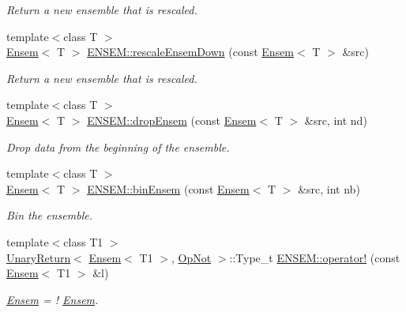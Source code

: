 \begin{DoxyCompactItemize}
\begin{DoxyCompactList}\small\item\em Return a new ensemble that is rescaled. \end{DoxyCompactList}\item 
{\footnotesize template$<$class T $>$ }\\\mbox{\hyperlink{classENSEM_1_1Ensem}{Ensem}}$<$ T $>$ \mbox{\hyperlink{group__eensem_gae1ec6cc73aa72bf1f07360fa333487fe}{E\+N\+S\+E\+M\+::rescale\+Ensem\+Down}} (const \mbox{\hyperlink{classENSEM_1_1Ensem}{Ensem}}$<$ T $>$ \&src)
\begin{DoxyCompactList}\small\item\em Return a new ensemble that is rescaled. \end{DoxyCompactList}\item 
{\footnotesize template$<$class T $>$ }\\\mbox{\hyperlink{classENSEM_1_1Ensem}{Ensem}}$<$ T $>$ \mbox{\hyperlink{group__eensem_gae6658352073b607eb80030d2c69e5383}{E\+N\+S\+E\+M\+::drop\+Ensem}} (const \mbox{\hyperlink{classENSEM_1_1Ensem}{Ensem}}$<$ T $>$ \&src, int nd)
\begin{DoxyCompactList}\small\item\em Drop data from the beginning of the ensemble. \end{DoxyCompactList}\item 
{\footnotesize template$<$class T $>$ }\\\mbox{\hyperlink{classENSEM_1_1Ensem}{Ensem}}$<$ T $>$ \mbox{\hyperlink{group__eensem_ga26ac0e4150e2c67b69a13b6965beb29f}{E\+N\+S\+E\+M\+::bin\+Ensem}} (const \mbox{\hyperlink{classENSEM_1_1Ensem}{Ensem}}$<$ T $>$ \&src, int nb)
\begin{DoxyCompactList}\small\item\em Bin the ensemble. \end{DoxyCompactList}\item 
{\footnotesize template$<$class T1 $>$ }\\\mbox{\hyperlink{structENSEM_1_1UnaryReturn}{Unary\+Return}}$<$ \mbox{\hyperlink{classENSEM_1_1Ensem}{Ensem}}$<$ T1 $>$, \mbox{\hyperlink{structENSEM_1_1OpNot}{Op\+Not}} $>$\+::Type\+\_\+t \mbox{\hyperlink{group__eensem_gad6dafbd7d34da088e6eaf463aa56e301}{E\+N\+S\+E\+M\+::operator!}} (const \mbox{\hyperlink{classENSEM_1_1Ensem}{Ensem}}$<$ T1 $>$ \&l)
\begin{DoxyCompactList}\small\item\em \mbox{\hyperlink{classENSEM_1_1Ensem}{Ensem}} = ! \mbox{\hyperlink{classENSEM_1_1Ensem}{Ensem}}. \end{DoxyCompactList}\item 

\end{DoxyCompactItemize}
